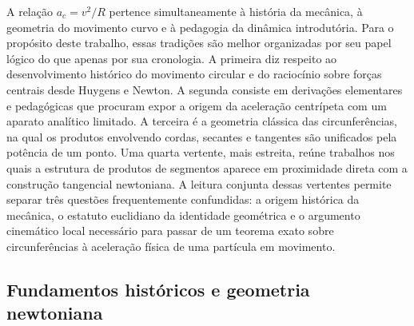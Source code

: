 \documentclass[12pt,a4paper]{article}
\numberwithin{equation}{section}
\theoremstyle{remark}
\begin{document}
A relação $a_c=v^2/R$ pertence simultaneamente à história da mecânica, à geometria do movimento curvo e à pedagogia da dinâmica introdutória. Para o propósito deste trabalho, essas tradições são melhor organizadas por seu papel lógico do que apenas por sua cronologia. A primeira diz respeito ao desenvolvimento histórico do movimento circular e do raciocínio sobre forças centrais desde Huygens e Newton. A segunda consiste em derivações elementares e pedagógicas que procuram expor a origem da aceleração centrípeta com um aparato analítico limitado. A terceira é a geometria clássica das circunferências, na qual os produtos envolvendo cordas, secantes e tangentes são unificados pela potência de um ponto. Uma quarta vertente, mais estreita, reúne trabalhos nos quais a estrutura de produtos de segmentos aparece em proximidade direta com a construção tangencial newtoniana. A leitura conjunta dessas vertentes permite separar três questões frequentemente confundidas: a origem histórica da mecânica, o estatuto euclidiano da identidade geométrica e o argumento cinemático local necessário para passar de um teorema exato sobre circunferências à aceleração física de uma partícula em movimento.

\subsection{Fundamentos históricos e geometria newtoniana}
\end{document}
